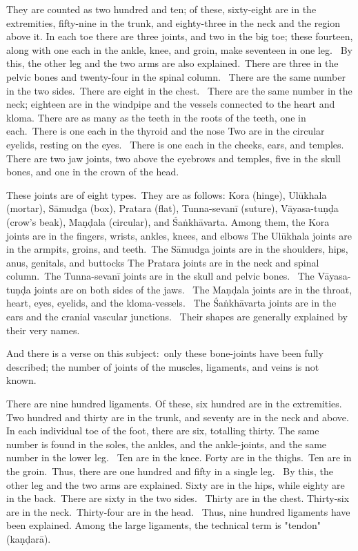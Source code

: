\begin{translation}
\begin{tt}
\item[26]
They are counted as two hundred and ten; of these, sixty-eight are in the extremities, fifty-nine in the trunk, and eighty-three in the neck and the region above it. In each toe there are three joints, and two in the big toe; these fourteen, along with one each in the ankle, knee, and groin, make seventeen in one leg.  By this, the other leg and the two arms are also explained. There are three in the pelvic bones and twenty-four in the spinal column.  There are the same number in the two sides. There are eight in the chest.  There are the same number in the neck; eighteen are in the windpipe and the vessels connected to the heart and kloma. There are as many as the teeth in the roots of the teeth, one in each. There is one each in the thyroid and the nose Two are in the circular eyelids, resting on the eyes. 
There is one each in the cheeks, ears, and temples.  There are two jaw joints, two above the eyebrows and temples, five in the skull bones, and one in the crown of the head. 

\item[27]
These joints are of eight types. They are as follows: Kora (hinge), Ulūkhala (mortar), Sāmudga (box), Pratara (flat), Tunna-sevanī (suture), Vāyasa-tuṇḍa (crow's beak), Maṇḍala (circular), and Śaṅkhāvarta. Among them, the Kora joints are in the fingers, wrists, ankles, knees, and elbows The Ulūkhala joints are in the armpits, groins, and teeth. The Sāmudga joints are in the shoulders, hips, anus, genitals, and buttocks The Pratara joints are in the neck and spinal column. The Tunna-sevanī joints are in the skull and pelvic bones.  The Vāyasa-tuṇḍa joints are on both sides of the jaws.  The Maṇḍala joints are in the throat, heart, eyes, eyelids, and the kloma-vessels.  The Śaṅkhāvarta joints are in the ears and the cranial vascular junctions.  Their shapes are generally explained by their very names. 

\item[28]
And there is a verse on this subject: only these bone-joints have been fully described; the number of joints of the muscles, ligaments, and veins is not known.  


\item[29]
There are nine hundred ligaments. Of these, six hundred are in the extremities.  Two hundred and thirty are in the trunk, and seventy are in the neck and above.  In each individual toe of the foot, there are six, totalling thirty. The same number is found in the soles, the ankles, and the ankle-joints, and the same number in the lower leg.  Ten are in the knee. Forty are in the thighs. Ten are in the groin. Thus, there are one hundred and fifty in a single leg.  By this, the other leg and the two arms are explained. Sixty are in the hips, while eighty are in the back. There are sixty in the two sides.  Thirty are in the chest. Thirty-six are in the neck. Thirty-four are in the head.  Thus, nine hundred ligaments have been explained. Among the large ligaments, the technical term is "tendon" (kaṇḍarā). 



\end{tt}
\end{translation}
